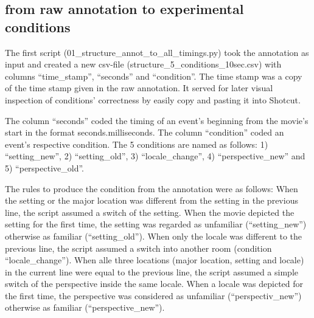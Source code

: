 \documentclass[10pt,a4paper,twocolumn]{article}
\begin{document}

\subsection*{from raw annotation to experimental conditions}


The first script (01\_structure\_annot\_to\_all\_timings.py) took
the annotation as input and created a new csv-file (structure\_5\_conditions\_10sec.csv)
with columns ``time\_stamp'', ``seconds'' and ``condition''.
The time stamp was a copy of the time stamp given in the raw annotation.
It served for later visual inspection of conditions' correctness by
easily copy and pasting it into Shotcut. 

The column ``seconds'' coded the timing of an event's beginning
from the movie's start in the format seconds.milliseconds. The column
``condition'' coded an event's respective condition. The 5 conditions
are named as follows: 1) ``setting\_new'', 2) ``setting\_old'',
3) ``locale\_change'', 4) ``perspective\_new'' and 5) ``perspective\_old''. 

The rules to produce the condition from the annotation were as follows:
When the setting or the major location was different from the setting
in the previous line, the script assumed a switch of the setting.
When the movie depicted the setting for the first time, the setting
was regarded as unfamiliar (``setting\_new'') otherwise as familiar
(``setting\_old''). When only the locale was different to the previous
line, the script assumed a switch into another room (condition ``locale\_change'').
When alle three locations (major location, setting and locale) in
the current line were equal to the previous line, the script assumed
a simple switch of the perspective inside the same locale. When a
locale was depicted for the first time, the perspective was considered
as unfamiliar (``perspectiv\_new'') otherwise as familiar (``perspective\_new''). 
\end{document}
